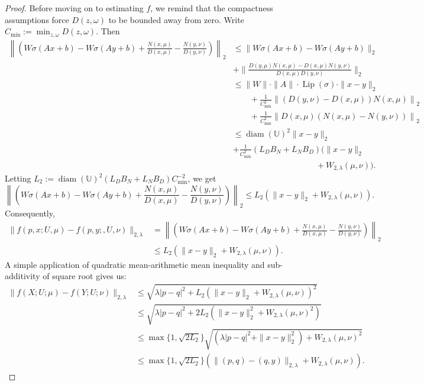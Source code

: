 \documentclass[11pt]{article}
\newcommand{\UU}{\mathbb{U}}
\begin{document}
\begin{proof}
Before moving on to estimating $f$, we remind that the compactness assumptions force $D(z,\omega)$ to be bounded away from zero. Write $C_{\text{min}} := \min_{z,\omega}D(z,\omega)$. Then
\begin{align*}
    \left\|\left(W\sigma(Ax + b) - W\sigma(Ay + b) + \frac{N(x,\mu)}{D(x,\mu)} - \frac{N(y,\nu)}{D(y,\nu)}\right)\right\|_{2} &\leq \bigg\| W\sigma(Ax + b) - W\sigma(Ay + b)\bigg\|_{2} \\
    &+\bigg\|\frac{D(y,\mu)N(x,\mu) - D(x,\mu)N(y,\nu)}{D(x,\mu)D(y,\nu)}\bigg\|_{2}\\
    &\leq \|W\|\cdot\|A\|\cdot\operatorname{Lip}(\sigma)\cdot\|x-y\|_{2}\\
    &\qquad+\frac{1}{C_{\text{min}}^2}\left\|(D(y,\nu) - D(x,\mu))N(x,\mu)\right\|_{2}\\
    &\qquad+\frac{1}{C_{\text{min}}^2}\left\|D(x,\mu)(N(x,\mu) - N(y,\nu))\right\|_{2}\\
    &\leq \operatorname{diam}(\UU)^2\|x-y\|_{2}\\
    &+ \frac{1}{C_{\text{min}}^2}(L_DB_N + L_NB_D)(\|x-y\|_2 \\
    &\hspace{10em}+ W_{2,\lambda}(\mu,\nu)).
\end{align*}
Letting $L_2 := \operatorname{diam}(\UU)^2(L_DB_N + L_NB_D)C_{\text{min}}^{-2}$, we get
\begin{equation*}
    \left\|\left(W\sigma(Ax + b) - W\sigma(Ay + b) + \frac{N(x,\mu)}{D(x,\mu)} - \frac{N(y,\nu)}{D(y,\nu)}\right)\right\|_{2} \leq L_2(\|x-y\|_2 + W_{2,\lambda}(\mu,\nu)).
\end{equation*}
Consequently,
\begin{align*}
    \|f(p,x;U,\mu)-f(p,y;,U,\nu)\|_{2,\lambda} &= \left\|\left(W\sigma(Ax + b) - W\sigma(Ay + b) + \frac{N(x,\mu)}{D(x,\mu)} - \frac{N(y,\nu)}{D(y,\nu)}\right)\right\|_{2}\\
    &\leq L_2(\|x-y\|_2 + W_{2,\lambda}(\mu,\nu)).
\end{align*}
A simple application of quadratic mean-arithmetic mean inequality and sub-additivity of square root gives us:
    \begin{align*}
        \|f(X;U;\mu) - f(Y; U; \nu)\|_{2,\lambda} &\leq \sqrt{\lambda|p-q|^2 + L_2(\|x-y\|_2 + W_{2,\lambda}(\mu,\nu))^2}\\
        &\leq \sqrt{\lambda|p-q|^2 + 2L_2(\|x-y\|_2^2 + W_{2,\lambda}(\mu,\nu)^2)}\\
        &\leq \max\{1, \sqrt{2L_2}\}\sqrt{(\lambda|p-q|^2 + \|x-y\|_2^2) + W_{2,\lambda}(\mu,\nu)^2}\\
        &\leq \max\{1, \sqrt{2L_2}\}(\|(p,q)-(q,y)\|_{2,\lambda} + W_{2,\lambda}(\mu,\nu)).
    \end{align*}
\end{proof}
\end{document}
